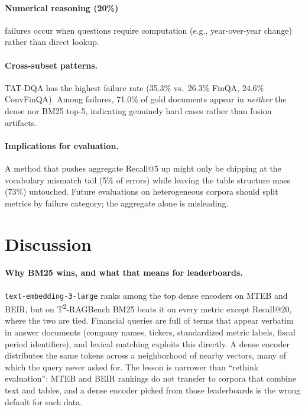 \documentclass{article}
\begin{document}
\paragraph{Numerical reasoning (20\%)} failures occur when questions require computation (e.g., year-over-year change) rather than direct lookup.

\paragraph{Cross-subset patterns.} TAT-DQA has the highest failure rate (35.3\% vs.\ 26.3\% FinQA, 24.6\% ConvFinQA). Among failures, 71.0\% of gold documents appear in \emph{neither} the dense nor BM25 top-5, indicating genuinely hard cases rather than fusion artifacts.

\paragraph{Implications for evaluation.} A method that pushes aggregate Recall@5 up might only be chipping at the vocabulary mismatch tail (5\% of errors) while leaving the table structure mass (73\%) untouched. Future evaluations on heterogeneous corpora should split metrics by failure category; the aggregate alone is misleading.

\section{Discussion}
\label{sec:discussion}

\paragraph{Why BM25 wins, and what that means for leaderboards.}
\texttt{text-embedding-3-large} ranks among the top dense encoders on MTEB and BEIR, but on T\textsuperscript{2}-RAGBench BM25 beats it on every metric except Recall@20, where the two are tied. Financial queries are full of terms that appear verbatim in answer documents (company names, tickers, standardized metric labels, fiscal period identifiers), and lexical matching exploits this directly. A dense encoder distributes the same tokens across a neighborhood of nearby vectors, many of which the query never asked for. The lesson is narrower than ``rethink evaluation'': MTEB and BEIR rankings do not transfer to corpora that combine text and tables, and a dense encoder picked from those leaderboards is the wrong default for such data.
\end{document}
